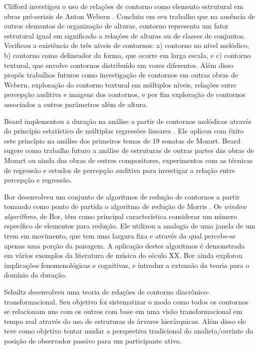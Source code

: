 \documentclass[12pt]{article}
\newcommand{\eng}[1]{\textit{#1}}
\begin{document}

Clifford investigou o uso de relações de contorno como elemento
estrutural em obras pré-seriais de Anton Webern
\cite{clifford95:contour}. Concluiu em seu trabalho que na ausência de
outros elementos de organização de alturas, contorno representa um
fator estrutural igual em significado a relações de alturas ou de
classes de conjuntos. Verificou a existência de três níveis de
contornos: a) contorno no nível melódico, b) contorno como delineador
da forma, que ocorre em larga escala, e c) contorno textural, que
envolve contornos distribuído em vozes diferentes. Além disso propôs
trabalhos futuros como investigação de contornos em outras obras de
Webern, exploração do contorno textural em múltiplos níveis, relações
entre percepção auditiva e imagens dos contornos, e por fim exploração
de contornos associados a outros parâmetros além de altura.


Beard implementou a duração na análise a partir de contornos melódicos
através do princípio estatístico de múltiplas regressões lineares
\cite{beard03:contour}. Ele aplicou com êxito este princípio na
análise dos primeiros temas de 19 sonatas de Mozart. Beard sugere como
trabalho futuro a análise de estruturas de outras partes das obras de
Mozart ou ainda das obras de outros compositores, experimentos com as
técnicas de regressão e estudos de percepção auditiva para investigar
a relação entre percepção e regressão.


Bor \cite{bor09:contour} desenvolveu um conjunto de algoritmos de
redução de contornos a partir tomando como ponto de partida o
algoritmo de redução de Morris \cite{morris93:directions}. Os
\eng{window algorithms}, de Bor, têm como principal característica
considerar um número específico de elementos para redução. Ele
utilizou a analogia de uma janela de um trem em movimento, que tem uma
largura fixa e através da qual percebe-se apenas uma porção da
paisagem. A aplicação destes algoritmos é demonstrada em vários
exemplos da literatura de música do século XX. Bor ainda explorou
implicações fenomenológicas e cognitivas, e introduz a extensão da
teoria para o domínio da duração.


Schultz \cite{schultz09:diachronic} desenvolveu uma teoria de relações
de contorno diacrônico-transformacional. Seu objetivo foi sistematizar
o modo como todos os contornos se relacionam uns com os outros com
base em uma visão transformacional em tempo real através do uso de
estruturas de árvores hierárquicas. Além disso ele teve como objetivo
tentar mudar a perspectiva tradicional do analista/ouvinte da posição
de observador passivo para um participante ativo.
\end{document}

